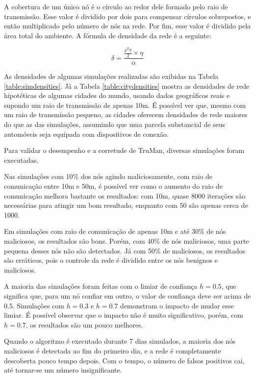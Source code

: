 \begin{resumoextendido}
	A cobertura de um único nó é o círculo ao redor dele formado pelo raio de transmissão.
	Esse valor é dividido por dois para compensar círculos sobrepostos, e então multiplicado pelo número de nós na rede.
	Por fim, esse valor é dividido pela área total do ambiente.
	A fórmula de densidade da rede é a seguinte:
	
	$$ \delta = \frac{\frac{\rho^2\pi}{2} \times \eta}{\alpha} $$
	
	As densidades de algumas simulações realizadas são exibidas na Tabela \ref{table:simdensities}.
	Já a Tabela \ref{table:citydensities} mostra as densidades de rede hipotéticas de algumas cidades do mundo, usando dados geográficos reais e supondo um raio de transmissão de apenas 10m.
	É possível ver que, mesmo com um raio de transmissão pequeno, as cidades oferecem densidades de rede maiores do que as das simulações, assumindo que uma parcela substancial de seus automóveis seja equipada com dispositivos de conexão.
	
	
	Para validar o desempenho e a corretude de TruMan, diversas simulações foram executadas.
	
	Nas simulações com 10\% dos nós agindo maliciosamente, com raio de comunicação entre 10m e 50m, é possível ver como o aumento do raio de comunicação melhora bastante os resultados: com 10m, quase 8000 iterações são necessárias para atingir um bom resultado, enquanto com 50 são apenas cerca de 1000.
	
	Em simulações com raio de comunicação de apenas 10m e até 30\% de nós maliciosos, os resultados são bons. 
	Porém, com 40\% de nós maliciosos, uma parte pequena desses nós não são detectados.
	Já com 50\% de maliciosos, os resultados são erráticos, pois o controle da rede é dividido entre os nós benignos e maliciosos.
	
	A maioria das simulações foram feitas com o limiar de confiança $h=0.5$, que significa que, para um nó confiar em outro, o valor de confiança deve ser acima de $0.5$.
	Simulações com $h=0.3$ e $h=0.7$ demonstram o impacto de mudar esse limiar.
	É possível observar que o impacto não é muito significativo, porém, com $h=0.7$, os resultados são um pouco melhores.
	
	Quando o algoritmo é executado durante 7 dias simulados, a maioria dos nós maliciosos é detectada ao fim do primeiro dia, e a rede é completamente descoberta pouco tempo depois.
	Com o tempo, o número de falsos positivos cai, até tornar-se um número insignificante.
	

\end{resumoextendido}
